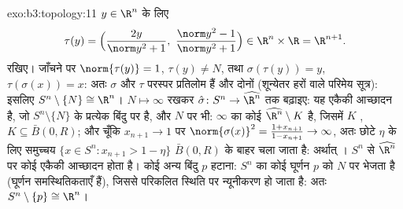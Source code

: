 \begin{solution}{exo:b3:topology:11}
$y \in \R^n$ के लिए
\[
\tau(y) = \Bigl(\frac{2y}{\norm y^2 + 1},\ \frac{\norm y^2 -
1}{\norm y^2 + 1}\Bigr) \in \R^n\times\R = \R^{n+1}.
\]
रखिए। जाँचने पर $\norm{\tau(y)} = 1$, $\tau(y) \neq N$, तथा $\sigma(\tau(y)) = y$, $\tau(\sigma(x)) = x$: अतः $\sigma$ और $\tau$
परस्पर प्रतिलोम हैं और दोनों  (शून्येतर हरों वाले परिमेय सूत्र):
इसलिए $S^n\setminus\{N\} \cong
\R^n$। $N \mapsto \infty$ रखकर $\hat\sigma \colon S^n \to \widehat{\R^n}$ तक बढ़ाइए: यह एकैकी आच्छादन है, जो
$S^n\setminus\{N\}$ के प्रत्येक बिंदु पर  है, और $N$ पर भी: $\infty$ का कोई
  $\widehat{\R^n}\setminus K$ है, जिसमें $K$ , $K
\subseteq \bar B(0, R)$; और चूँकि $x_{n+1} \to 1$ पर
$\norm{\sigma(x)}^2 = \frac{1 +
x_{n+1}}{1 - x_{n+1}} \to \infty$, अतः छोटे $\eta$ के लिए समुच्चय $\{x \in S^n : x_{n+1} > 1 - \eta\}$ $\bar B(0,R)$ के बाहर चला जाता
है: अर्थात् ।  $S^n$ से  $\widehat{\R^n}$ पर कोई  एकैकी
आच्छादन  होता है। कोई अन्य बिंदु $p$ हटाना: $S^n$ का
कोई घूर्णन $p$ को $N$ पर भेजता है (घूर्णन समस्थितिकताएँ हैं),
जिससे परिकलित स्थिति पर न्यूनीकरण हो जाता है: अतः $S^n \setminus \{p\} \cong \R^n$।
\end{solution}


